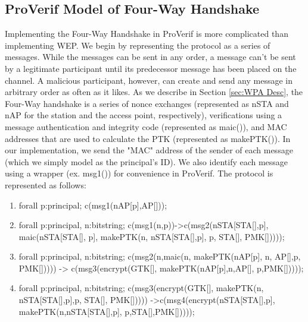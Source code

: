 \documentclass[11pt, twocolumn]{article} %
\begin{document}
{\subsection{ProVerif Model of Four-Way Handshake}
Implementing the Four-Way Handshake in ProVerif is more complicated than implementing WEP.  We begin by representing the protocol as a series of messages.  While the messages can be sent in any order, a message can't be sent by a legitimate participant until its predecessor message has been placed on the channel.  A malicious participant, however, can create and send any message in arbitrary order as often as it likes. As we describe in Section \ref{sec:WPA Desc}, the Four-Way handshake is a series of nonce exchanges (represented as nSTA and nAP for the station and the access point, respectively), verifications using a message authentication and integrity code (represented as maic()), and MAC addresses that are used to calculate the PTK (represented as makePTK()).  In our implementation, we send the "MAC" address of the sender of each message (which we simply model as the principal's ID).  We also identify each message using a wrapper (ex. msg1()) for convenience in ProVerif.  The protocol is represented as follows:
\begin{enumerate}[leftmargin=4mm]
\item
\begin{verbatimtab}[2]
forall p:principal; c(msg1(nAP[p],AP[]));
\end{verbatimtab}
\item
\begin{verbatimtab}[2]
forall p:principal, n:bitstring; 
	c(msg1(n,p))->c(msg2(nSTA[STA[],p], 
		maic(nSTA[STA[], p], 
			makePTK(n, nSTA[STA[],p],
				p, STA[], PMK[]))));
\end{verbatimtab}
\item
\begin{verbatimtab}[2]
forall p:principal, n:bitstring; 
	c(msg2(n,maic(n, makePTK(nAP[p],
		n, AP[],p, PMK[])))) -> 
			c(msg3(encrypt(GTK[], 
				makePTK(nAP[p],n,AP[],
					p,PMK[]))));
\end{verbatimtab}
\item
\begin{verbatimtab}[2]
forall p:principal, n:bitstring; 
	c(msg3(encrypt(GTK[], makePTK(n,
		nSTA[STA[],p],p, STA[], PMK[])))) 
			->c(msg4(encrypt(nSTA[STA[],p],
					makePTK(n,nSTA[STA[],p],
						p,STA[],PMK[]))));
\end{verbatimtab}
\end{enumerate}

}
\end{document}
